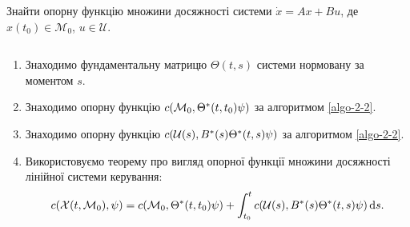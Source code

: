 \vspace*{\baselineskip}

\begin{problem*}
	Знайти опорну функцію множини досяжності системи $\dot x = A x + B u$, де $x(t_0) \in \mathcal{M}_0$, $u \in \mathcal{U}$.
\end{problem*}

\begin{algorithm}
	\label{algo-2-5}
	$\left.\right.$
	\begin{enumerate}
		\item Знаходимо фундаментальну матрицю $\Theta(t,s)$ системи нормовану за моментом $s$.
		\item Знаходимо опорну функцію $c(\mathcal{M}_0, \Theta^*(t, t_0) \psi)$ за алгоритмом \ref{algo-2-2}.
		\item Знаходимо опорну функцію $c(\mathcal{U}(s), B^*(s) \Theta^*(t, s) \psi)$ за алгоритмом \ref{algo-2-2}.
		\item Використовуємо теорему про вигляд опорної функції множини досяжності лінійної системи керування: 
		\begin{equation}
			\label{eq:2.8}
			c(\mathcal{X}(t, \mathcal{M}_0), \psi) = c(\mathcal{M}_0, \Theta^*(t, t_0) \psi) + \int_{t_0}^t c(\mathcal{U}(s), B^*(s) \Theta^*(t, s) \psi) \mathop{}\!\mathrm{d} s.
		\end{equation}
	\end{enumerate}
\end{algorithm}

